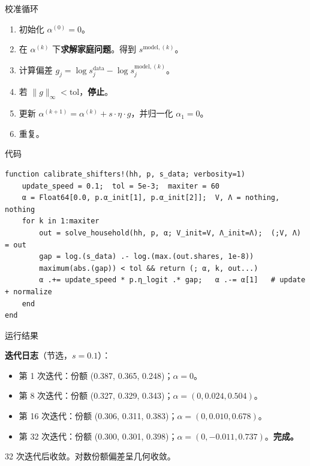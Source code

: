 \documentclass[10pt,aspectratio=169]{beamer}
\begin{document}
\begin{frame}{校准循环}

\begin{enumerate}
  \item 初始化 $\alpha^{(0)} = 0$。
  \item 在 $\alpha^{(k)}$ 下\textbf{求解家庭问题}。得到 $s^{\text{model}, (k)}$。
  \item 计算偏差 $g_j = \log s_j^{\text{data}} - \log s_j^{\text{model}, (k)}$。
  \item 若 $\| g \|_\infty < \text{tol}$，\textbf{停止}。
  \item 更新 $\alpha^{(k+1)} = \alpha^{(k)} + s \cdot \eta \cdot g$，并归一化 $\alpha_1 = 0$。
  \item 重复。
\end{enumerate}

\end{frame}

\begin{frame}[fragile]{代码}
\begin{lstlisting}
function calibrate_shifters!(hh, p, s_data; verbosity=1)
    update_speed = 0.1;  tol = 5e-3;  maxiter = 60
    α = Float64[0.0, p.α_init[1], p.α_init[2]];  V, Λ = nothing, nothing
    for k in 1:maxiter
        out = solve_household(hh, p, α; V_init=V, Λ_init=Λ);  (;V, Λ) = out
        gap = log.(s_data) .- log.(max.(out.shares, 1e-8))
        maximum(abs.(gap)) < tol && return (; α, k, out...)
        α .+= update_speed * p.η_logit .* gap;   α .-= α[1]   # update + normalize
    end
end
\end{lstlisting}

\end{frame}

\begin{frame}{运行结果}

\textbf{迭代日志}（节选，$s = 0.1$）：

\begin{itemize}
  \item 第 1 次迭代：份额 (0.387, 0.365, 0.248)；$\alpha = 0$。
  \item 第 8 次迭代：份额 (0.327, 0.329, 0.343)；$\alpha = (0, 0.024, 0.504)$。
  \item 第 16 次迭代：份额 (0.306, 0.311, 0.383)；$\alpha = (0, 0.010, 0.678)$。
  \item 第 32 次迭代：份额 (0.300, 0.301, 0.398)；$\alpha = (0, -0.011, 0.737)$。\textbf{完成。}
\end{itemize}

\vspace{0.4em}

32 次迭代后收敛。对数份额偏差呈几何收敛。

\end{frame}
\end{document}

